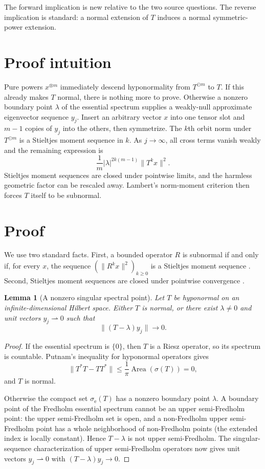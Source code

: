 \documentclass[11pt]{article}
\newtheorem{lemma}{Lemma}
\newcommand{\ess}{\mathrm e}
\newcommand{\od}{\mathbin{\odot}}
\begin{document}
The forward implication is new relative to the two source questions.  The
reverse implication is standard: a normal extension of $T$ induces a normal
symmetric-power extension.

\section{Proof intuition}

Pure powers $x^{\otimes m}$ immediately descend hyponormality from
$T^{\od m}$ to $T$.  If this already makes $T$ normal, there is nothing more
to prove.  Otherwise a nonzero boundary point $\lambda$ of the essential
spectrum supplies a weakly-null approximate eigenvector sequence $y_j$.
Insert an arbitrary vector $x$ into one tensor slot and $m-1$ copies of $y_j$
into the others, then symmetrize.  The $k$th orbit norm under $T^{\od m}$ is
a Stieltjes moment sequence in $k$.  As $j\to\infty$, all cross terms vanish
weakly and the remaining expression is
\[
 \frac1m|\lambda|^{2k(m-1)}\lVert T^kx\rVert^2.
\]
Stieltjes moment sequences are closed under pointwise limits, and the harmless
geometric factor can be rescaled away.  Lambert's norm-moment criterion then
forces $T$ itself to be subnormal.

\section{Proof}

We use two standard facts.  First, a bounded operator $R$ is subnormal if and
only if, for every $x$, the sequence
$(\lVert R^kx\rVert^2)_{k\ge0}$ is a Stieltjes moment sequence
\cite[Proposition~2.3]{S96}.  Second, Stieltjes moment sequences are closed
under pointwise convergence \cite[(S2)]{S96}.

\begin{lemma}[A nonzero singular spectral point]\label{lem:singular}
Let $T$ be hyponormal on an infinite-dimensional Hilbert space.  Either $T$
is normal, or there exist $\lambda\ne0$ and unit vectors $y_j\rightharpoonup0$
such that
\[
                     \lVert(T-\lambda)y_j\rVert\longrightarrow0.
\]
\end{lemma}

\begin{proof}
If the essential spectrum is $\{0\}$, then $T$ is a Riesz operator, so its
spectrum is countable.  Putnam's inequality for hyponormal operators gives
\[
 \lVert T^*T-TT^*\rVert
 \le \frac1\pi\operatorname{Area}(\sigma(T))=0,
\]
and $T$ is normal.

Otherwise the compact set $\sigma_{\ess}(T)$ has a nonzero boundary point
$\lambda$.  A boundary point of the Fredholm essential spectrum cannot be an
upper semi-Fredholm point: the upper semi-Fredholm set is open, and a
non-Fredholm upper semi-Fredholm point has a whole neighborhood of
non-Fredholm points (the extended index is locally constant).  Hence
$T-\lambda$ is not upper semi-Fredholm.  The singular-sequence
characterization of upper semi-Fredholm operators now gives unit vectors
$y_j\rightharpoonup0$ with $(T-\lambda)y_j\to0$.
\end{proof}
\end{document}
